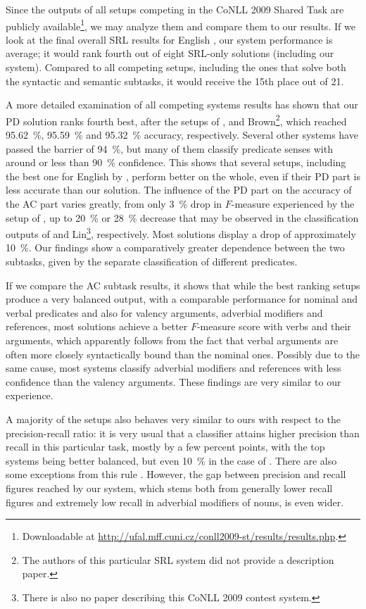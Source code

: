 \documentclass[12pt,notitlepage,a4paper]{report}
\begin{document}
Since the outputs of all setups competing in the CoNLL 2009 Shared Task are publicly available\footnote{Downloadable at \url{http://ufal.mff.cuni.cz/conll2009-st/results/results.php}.}, we may analyze them and compare them to our results. If we look at the final overall SRL results for English \citep[cf.\ tables in][]{hajic09}, our system performance is average; it would rank fourth out of eight SRL-only solutions (including our system). Compared to all competing setups, including the ones that solve both the syntactic and semantic subtasks, it would receive the 15th place out of 21.

A more detailed examination of all competing systems results has shown that our PD solution ranks fourth best, after the setups of \citet{tackstrom09}, \citet{nugues09} and Brown\footnote{The authors of this particular SRL system did not provide a description paper.}, which reached 95.62~\%, 95.59~\% and 95.32~\% accuracy, respectively. Several other systems have passed the barrier of 94~\%, but many of them classify predicate senses with around or less than 90~\% confidence. This shows that several setups, including the best one for English by \citet{chen09}, perform better on the whole, even if their PD part is less accurate than our solution. The influence of the PD part on the accuracy of the AC part varies greatly, from only 3~\% drop in $F$-measure experienced by the setup of \citet{li09}, up to 20~\% or 28~\% decrease that may be observed in the classification outputs of \citet{nugues09} and Lin\footnote{There is also no paper describing this CoNLL 2009 contest system.}, respectively. Most solutions display a drop of approximately 10~\%. Our findings show a comparatively greater dependence between the two subtasks, given by the separate classification of different predicates.

If we compare the AC subtask results, it shows that while the best ranking setups \citep{nugues09,zhao09} produce a very balanced output, with a comparable performance for nominal and verbal predicates and also for valency arguments, adverbial modifiers and references, most solutions achieve a better $F$-measure score with verbs and their arguments, which apparently follows from the fact that verbal arguments are often more closely syntactically bound than the nominal ones. Possibly due to the same cause, most systems classify adverbial modifiers and references with less confidence than the valency arguments. These findings are very similar to our experience.

A majority of the setups also behaves very similar to ours with respect to the precision-recall ratio: it is very usual that a classifier attains higher precision than recall in this particular task, mostly by a few percent points, with the top systems being better balanced, but even 10~\% in the case of \citet{meza-ruiz09}. There are also some exceptions from this rule \citep{vallejo09}. However, the gap between precision and recall figures reached by our system, which stems both from generally lower recall figures and extremely low recall in adverbial modifiers of nouns, is even wider.
\end{document}
